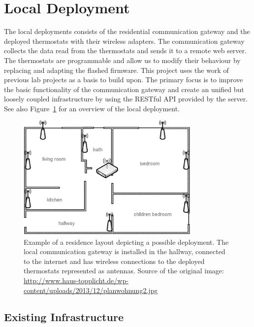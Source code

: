 
\section{Local Deployment}
\label{sec:local_infrastructure}

The local deployments consists of the residential communication gateway and the deployed thermostats with their wireless adapters. The communication gateway collects the data read from the thermostats and sends it to a remote web server. The thermostats are programmable and allow us to modify their behaviour by replacing and adapting the flashed firmware. This project uses the work of previous lab projects as a basis to build upon. The primary focus is to improve the basic functionality of the communication gateway and create an unified but loosely coupled infrastructure by using the RESTful API provided by the server.
See also Figure~\ref{fig:residence_layout} for an overview of the local deployment.

\begin{figure}[h]
\begin{center}
\includegraphics[width=0.8\textwidth]{images/residence_layout_schema.png}
\end{center}
\caption{Example of a residence layout depicting a possible deployment. The local communication gateway is installed in the hallway, connected to the internet and has wireless connections to the deployed thermostats represented as antennas. Source of the original image: \url{http://www.haus-topplicht.de/wp-content/uploads/2013/12/planwohnung2.jpg}}
\label{fig:residence_layout}
\end{figure}

\subsection{Existing Infrastructure}

